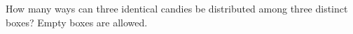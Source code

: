 How many ways can three identical candies be distributed among three distinct boxes? Empty boxes are allowed.
